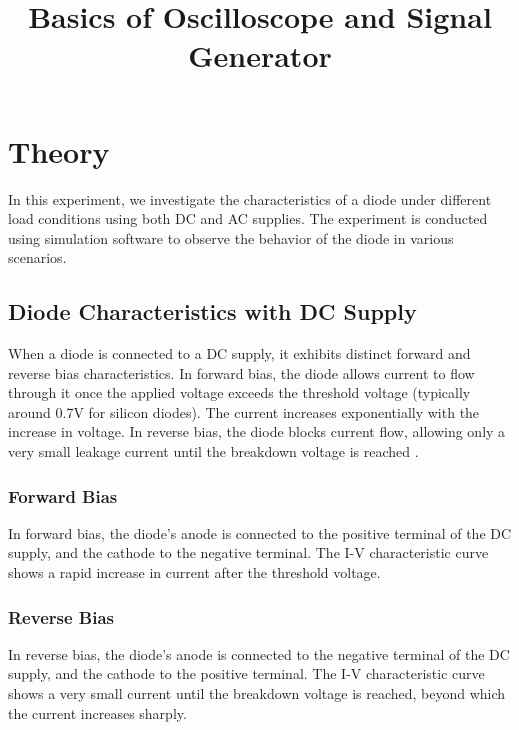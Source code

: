 \documentclass[12pt]{article}
\title{Basics of Oscilloscope and Signal Generator}
\author{}
\date{}
\begin{document}


\pagebreak

\tableofcontents

\pagebreak
{}
\maketitle

\section*{Theory}
In this experiment, we investigate the characteristics of a diode under different load conditions using both DC and AC supplies. The experiment is conducted using simulation software to observe the behavior of the diode in various scenarios.

\subsection*{Diode Characteristics with DC Supply}
When a diode is connected to a DC supply, it exhibits distinct forward and reverse bias characteristics. In forward bias, the diode allows current to flow through it once the applied voltage exceeds the threshold voltage (typically around 0.7V for silicon diodes). The current increases exponentially with the increase in voltage. In reverse bias, the diode blocks current flow, allowing only a very small leakage current until the breakdown voltage is reached \cite{diode_characteristics}.

\subsubsection*{Forward Bias}
In forward bias, the diode's anode is connected to the positive terminal of the DC supply, and the cathode to the negative terminal. The I-V characteristic curve shows a rapid increase in current after the threshold voltage.

\subsubsection*{Reverse Bias}
In reverse bias, the diode's anode is connected to the negative terminal of the DC supply, and the cathode to the positive terminal. The I-V characteristic curve shows a very small current until the breakdown voltage is reached, beyond which the current increases sharply.
\end{document}
